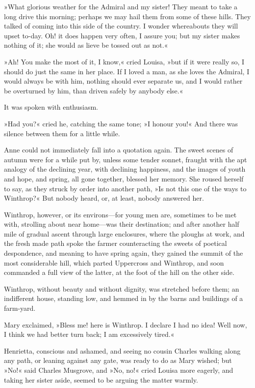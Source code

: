 »What glorious weather for the Admiral and my sister! They meant to take a long drive this morning; perhaps we may hail them from some of these hills. They talked of coming into this side of the country. I wonder whereabouts they will upset to-day. Oh! it does happen very often, I assure you; but my sister makes nothing of it; she would as lieve be tossed out as not.«

»Ah! You make the most of it, I know,« cried Louisa, »but if it were really so, I should do just the same in her place. If I loved a man, as she loves the Admiral, I would always be with him, nothing should ever separate us, and I would rather be overturned by him, than driven safely by anybody else.«

It was spoken with enthusiasm.

»Had you?« cried he, catching the same tone; »I honour you!« And there was silence between them for a little while.

Anne could not immediately fall into a quotation again. The sweet scenes of autumn were for a while put by, unless some tender sonnet, fraught with the apt analogy of the declining year, with declining happiness, and the images of youth and hope, and spring, all gone together, blessed her memory. She roused herself to say, as they struck by order into another path, »Is not this one of the ways to Winthrop?« But nobody heard, or, at least, nobody answered her.

Winthrop, however, or its environs—for young men are, sometimes to be met with, strolling about near home—was their destination; and after another half mile of gradual ascent through large enclosures, where the ploughs at work, and the fresh made path spoke the farmer counteracting the sweets of poetical despondence, and meaning to have spring again, they gained the summit of the most considerable hill, which parted Uppercross and Winthrop, and soon commanded a full view of the latter, at the foot of the hill on the other side.

Winthrop, without beauty and without dignity, was stretched before them; an indifferent house, standing low, and hemmed in by the barns and buildings of a farm-yard.

Mary exclaimed, »Bless me! here is Winthrop. I declare I had no idea! Well now, I think we had better turn back; I am excessively tired.«

Henrietta, conscious and ashamed, and seeing no cousin Charles walking along any path, or leaning against any gate, was ready to do as Mary wished; but »No!« said Charles Musgrove, and »No, no!« cried Louisa more eagerly, and taking her sister aside, seemed to be arguing the matter warmly.

